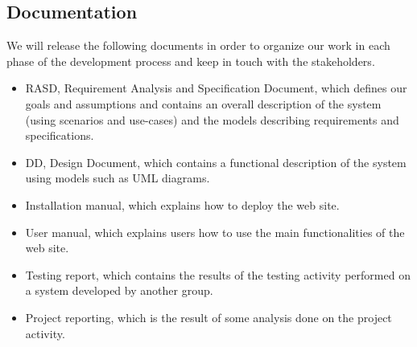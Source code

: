 \subsection{Documentation}
We will release the following documents in order to organize our work in each phase of the development process and keep in touch with the stakeholders.
\begin{itemize}
	\item RASD, Requirement Analysis and Specification Document, which defines our goals and assumptions and contains an overall description of the system (using scenarios and use-cases) and the models describing requirements and specifications.
	\item DD, Design Document, which contains a functional description of the system using models such as UML diagrams.
	\item Installation manual, which explains how to deploy the web site.
	\item User manual, which explains users how to use the main functionalities of the web site.
	\item Testing report, which contains the results of the testing activity performed on a system developed by another group.
	\item Project reporting, which is the result of some analysis done on the project activity.
\end{itemize}